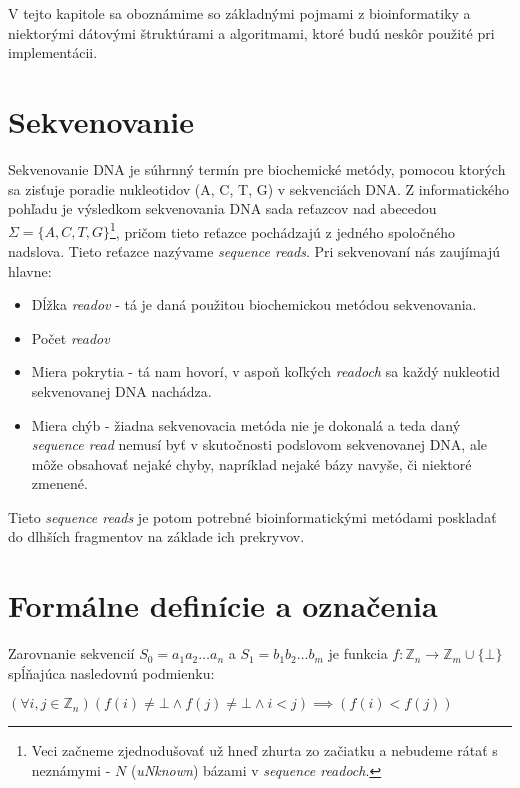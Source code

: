 V tejto kapitole sa oboznámime so základnými pojmami z bioinformatiky a
niektorými dátovými štruktúrami a algoritmami, ktoré budú neskôr použité pri
implementácii.

\section{Sekvenovanie}
\label{sec:sekvenovanie}
Sekvenovanie DNA je súhrnný termín pre biochemické metódy, pomocou ktorých sa zisťuje poradie nukleotidov (A, C, T, G) v sekvenciách DNA. Z informatického pohľadu je výsledkom sekvenovania DNA sada reťazcov nad abecedou $\Sigma = \{A, C, T, G\}$\footnote{Veci začneme zjednodušovať už hneď zhurta zo začiatku a nebudeme rátať s neznámymi - $N$ (\emph{uNknown}) bázami v \emph{sequence readoch}.}, pričom tieto reťazce pochádzajú z jedného spoločného nadslova. Tieto reťazce nazývame \emph{sequence reads}. Pri sekvenovaní nás zaujímajú hlavne:

\begin{itemize}
    \item Dĺžka \emph{readov} - tá je daná použitou biochemickou metódou sekvenovania.
    \item Počet \emph{readov}
    \item Miera pokrytia - tá nam hovorí, v aspoň koľkých \emph{readoch} sa každý nukleotid sekvenovanej DNA nachádza.
    \item Miera chýb - žiadna sekvenovacia metóda nie je dokonalá a teda daný \emph{sequence read} nemusí byť v skutočnosti podslovom sekvenovanej DNA, ale môže obsahovať nejaké chyby, napríklad nejaké bázy navyše, či niektoré zmenené.
\end{itemize}

Tieto \emph{sequence reads} je potom potrebné bioinformatickými metódami poskladať do dlhších fragmentov na základe ich prekryvov.


\section{Formálne definície a označenia}
\label{sec:formalne_definicie}
\begin{defn}
    Zarovnanie sekvencií $S_0=a_1 a_2 \ldots a_n$ a $S_1 = b_1 b_2 \ldots b_m$ je funkcia $f : \mathbb{Z}_n \to \mathbb{Z}_m \cup \{ \bot \} $ spĺňajúca nasledovnú podmienku:
        
    $ (\forall i, j \in \mathbb{Z}_n) (f(i) \neq \bot \wedge f(j) \neq \bot \wedge i < j) \implies (f(i) < f(j)) $
\end{defn}
    
